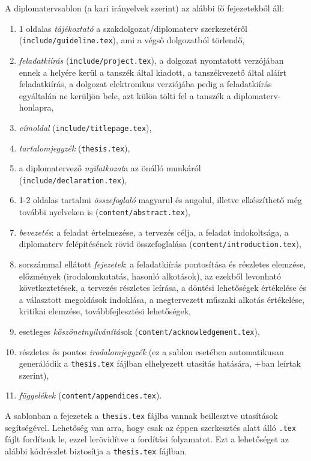 A diplomatervsablon (a kari irányelvek szerint) az alábbi fő fejezetekből áll:
\begin{enumerate}
	\item 1 oldalas \emph{tájékoztató} a szakdolgozat/diplomaterv szerkezetéről (\verb+include/guideline.tex+), ami a végső dolgozatból törlendő,
	\item \emph{feladatkiírás} (\verb+include/project.tex+), a dolgozat nyomtatott verzójában ennek a helyére kerül a tanszék által kiadott, a tanszékvezető által aláírt feladatkiírás, a dolgozat elektronikus verziójába pedig a feladatkiírás egyáltalán ne kerüljön bele, azt külön tölti fel a tanszék a diplomaterv-honlapra,
	\item \emph{címoldal} (\verb+include/titlepage.tex+),
	\item \emph{tartalomjegyzék} (\verb+thesis.tex+),
	\item a diplomatervező \emph{nyilatkozat}a az önálló munkáról (\verb+include/declaration.tex+),
	\item 1-2 oldalas tartalmi \emph{összefoglaló} magyarul és angolul, illetve elkészíthető még további nyelveken is (\verb+content/abstract.tex+),
	\item \emph{bevezetés}: a feladat értelmezése, a tervezés célja, a feladat indokoltsága, a diplomaterv felépítésének rövid összefoglalása (\verb+content/introduction.tex+),
	\item sorszámmal ellátott \emph{fejezetek}: a feladatkiírás pontosítása és részletes elemzése, előzmények (irodalomkutatás, hasonló alkotások), az ezekből levonható következtetések, a tervezés részletes leírása, a döntési lehetőségek értékelése és a választott megoldások indoklása, a megtervezett műszaki alkotás értékelése, kritikai elemzése, továbbfejlesztési lehetőségek,
	\item esetleges \emph{köszönetnyilvánítás}ok (\verb+content/acknowledgement.tex+),
	\item részletes és pontos \emph{irodalomjegyzék} (ez a sablon esetében automatikusan generálódik a \verb+thesis.tex+ fájlban elhelyezett \verb++ utasítás hatására, \az+ban leírtak szerint),
	\item \emph{függelékek} (\verb+content/appendices.tex+).
\end{enumerate}

A sablonban a fejezetek a \verb+thesis.tex+ fájlba vannak beillesztve \verb++ utasítások segítségével. Lehetőség van arra, hogy csak az éppen szerkesztés alatt álló \verb+.tex+ fájlt fordítsuk le, ezzel lerövidítve a fordítási folyamatot. Ezt a lehetőséget az alábbi kódrészlet biztosítja a \verb+thesis.tex+ fájlban.
\begin{lstlisting}

\end{lstlisting}

